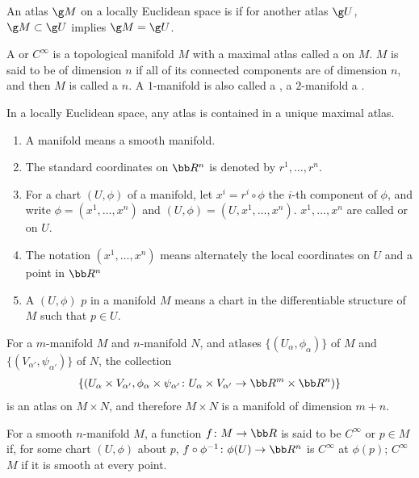 An atlas $\g M$ on a locally Euclidean space is  if for another atlas $\g U$, $\g M \subset \g U$ implies $\g M = \g U$.

A  or $C^\infty$  is a topological manifold $M$ with a maximal atlas called a  on $M$. $M$ is said to be of dimension $n$ if all of its connected components are of dimension $n$, and then $M$ is called a $n$. A $1$-manifold is also called a , a $2$-manifold a .

In a locally Euclidean space, any atlas is contained in a unique maximal atlas.

\begin{enumerate}
  \item A manifold means a smooth manifold.
  \item The standard coordinates on $\bb R^n$ is denoted by $r^1, \dotsc, r^n$.
  \item For a chart $(U, \phi)$ of a manifold, let $x^i = r^i \circ \phi$ the $i$-th component of $\phi$, and write $\phi = (x^1, \dotsc, x^n)$ and $(U, \phi) = (U, x^1, \dotsc, x^n)$. $x^1, \dotsc, x^n$ are called  or  on $U$.
  \item The notation $(x^1, \dotsc, x^n)$ means alternately the local coordinates on $U$ and a point in $\bb R^n$
  \item A  $(U, \phi)$  $p$ in a manifold $M$ means a chart in the differentiable structure of $M$ such that $p \in U$.
\end{enumerate}

For a $m$-manifold $M$ and $n$-manifold $N$, and atlases $\{(U_\alpha,\phi_\alpha)\}$ of $M$ and $\{(V_{\alpha'},\psi_{\alpha'})\}$ of $N$, the collection
\begin{align*}
  \{(U_\alpha \times V_{\alpha'}, \phi_\alpha \times \psi_{\alpha'} \colon U_\alpha \times V_{\alpha'} \to \bb R^m \times \bb R^n)\}
\end{align*}
is an atlas on $M \times N$, and therefore $M\times N$ is a manifold of dimension $m + n$.

For a smooth $n$-manifold $M$, a function $f \colon M \to \bb R$ is said to be $C^\infty$ or  $p \in M$ if, for some chart $(U,\phi)$ about $p$, $f \circ \phi^{-1} \colon \phi(U) \to \bb R^n$ is $C^\infty$ at $\phi(p)$; $C^\infty$  $M$ if it is smooth at every point.


